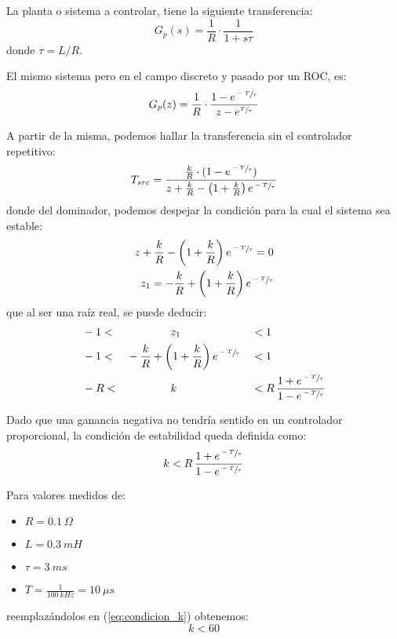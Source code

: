 \documentclass[titlepage, 12pt]{article}
\begin{document}
La planta o sistema a controlar, tiene la siguiente transferencia:
\begin{equation}
\label{eq:gp_cont}
    G_p(s) = \frac{1}{R} \cdot \frac{1}{1 + s\tau}
\end{equation}
donde $\tau = L/R$.

El mismo sistema pero en el campo discreto y pasado por un ROC, es:
\begin{equation}
\label{eq:gp_discr}
    G_p(z) = \frac{1}{R} \cdot \frac{1-e^{\sfrac{-T}{\tau}}}{z-e^{\sfrac{T}{\tau}}}
\end{equation}

A partir de la misma, podemos hallar la transferencia sin el controlador repetitivo:
\begin{equation}
\label{eq:tsrc_ideal}
    T_{src} = \frac{\frac{k}{R}\cdot (1-e^{\sfrac{-T}{\tau}})}{z + \frac{k}{R} - \left( 1 + \frac{k}{R} \right) e^{\sfrac{-T}{\tau}}}
\end{equation}
donde del dominador, podemos despejar la condición para la cual el sistema sea estable:
\begin{align*}
    z + \frac{k}{R} - \left( 1 + \frac{k}{R} \right) e^{\sfrac{-T}{\tau}} = 0 \\
    z_1 = -\frac{k}{R} + \left( 1 + \frac{k}{R} \right) e^{\sfrac{-T}{\tau}}
\end{align*}
que al ser una raíz real, se puede deducir:
\begin{alignat}{3}
\label{eq:k_condicion}
    & -1 < && \qquad \qquad z_1                                                 && < 1 \nonumber \\ 
    & -1 < && -\frac{k}{R} + \left( 1 + \frac{k}{R} \right) e^{\sfrac{-T}{\tau}} && < 1 \nonumber \\
    & -R < && \qquad \qquad k  && < R \, \frac{1 + e^{\sfrac{-T}{\tau}}}{1 - e^{\sfrac{-T}{\tau}}}
\end{alignat}

Dado que una ganancia negativa no tendría sentido en un controlador proporcional, la condición de estabilidad queda definida como:
\begin{equation}
\label{eq:condicion_k}
    k < R \, \frac{1 + e^{\sfrac{-T}{\tau}}}{1 - e^{\sfrac{-T}{\tau}}}
\end{equation}

Para valores medidos de:
    \begin{itemize}
        \item $R = \SI{0.1}{\Omega}$
        \item $L = \SI{0.3}{mH}$
        \item $\tau = \SI{3}{ms}$
        \item $T = \frac{1}{\SI{100}{kHz}} = \SI{10}{\mu s}$
    \end{itemize}
reemplazándolos en (\ref{eq:condicion_k}) obtenemos:
\begin{equation}
\label{eq:k_real_100khz}
    k < 60
\end{equation}
\end{document}
